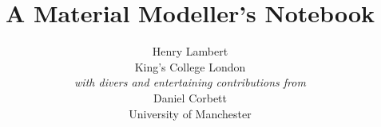 \documentclass[a4paper,11pt]{book}
\begin{document}
\frontmatter
\title{A Material Modeller's Notebook}
\author{Henry Lambert \\
\vspace{0.2cm} 
King's College London \\
\vspace{0.2cm}
{\it with divers and entertaining contributions from}\\
\vspace{0.2cm}
Daniel Corbett\\
\vspace{0.2cm}
University of Manchester
}

\maketitle
{}
\makeatletter
\tableofcontents

\mainmatter
{}





%



\begin{appendices}
\clearemptydoublepage
\end{appendices}
\small


\end{document}
